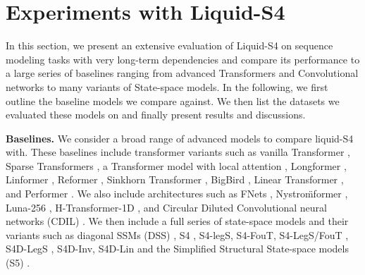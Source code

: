 \documentclass{MITcsail}
\begin{document}
\section{Experiments with Liquid-S4} 

In this section, we present an extensive evaluation of Liquid-S4 on sequence modeling tasks with very long-term dependencies and compare its performance to a large series of baselines ranging from advanced Transformers and Convolutional networks to many variants of State-space models. In the following, we first outline the baseline models we compare against. We then list the datasets we evaluated these models on and finally present results and discussions. 

\noindent \textbf{Baselines.} We consider a broad range of advanced models to compare liquid-S4 with. These baselines include transformer variants such as vanilla Transformer \citep{vaswani2017attention}, Sparse Transformers \citep{child2019generating}, a Transformer model with local attention \citep{tay2020long}, Longformer \citep{beltagy2020longformer}, Linformer \citep{wang2020linformer}, Reformer \citep{kitaev2019reformer}, Sinkhorn Transformer \citep{tay2020sparse}, BigBird \citep{zaheer2020big}, Linear Transformer \citep{katharopoulos2020transformers}, and Performer \citep{choromanski2020rethinking}. We also include architectures such as FNets \citep{lee2021fnet}, Nystro\"mformer \citep{xiong2021nystromformer}, Luna-256 \citep{ma2021luna}, H-Transformer-1D \citep{zhu2021h}, and Circular Diluted Convolutional neural networks (CDIL) \citep{cheng2022classification}. We then include a full series of state-space models and their variants such as diagonal SSMs (DSS) \citep{gupta2022diagonal}, S4 \citep{gu2022efficiently}, S4-legS, S4-FouT, S4-LegS/FouT \citep{gu2022train}, S4D-LegS \citep{gu2022parameterization}, S4D-Inv, S4D-Lin and the Simplified Structural State-space models (S5) \citep{smith2022simplified}.
\end{document}
